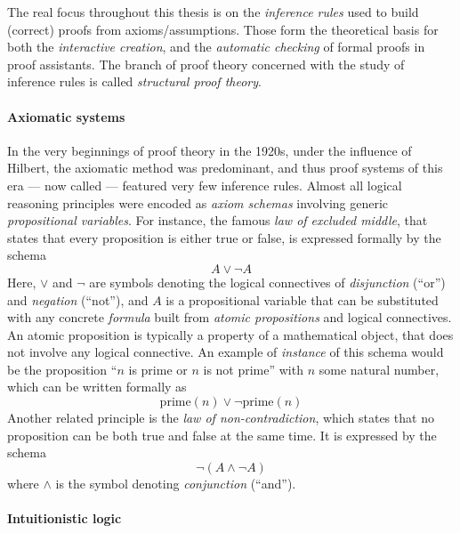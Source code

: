 \begin{emphpar}
The real focus throughout this thesis is on the \emph{inference rules} used to
build (correct) proofs from axioms/assumptions. Those form the theoretical basis
for both the \emph{interactive creation}, and the \emph{automatic checking} of
formal proofs in proof assistants. The branch of proof theory concerned with the
study of inference rules is called \emph{structural proof theory}.
\end{emphpar}

\paragraph{Axiomatic systems} 

In the very beginnings of proof theory in the 1920s, under the influence of
Hilbert, the axiomatic method was predominant, and thus proof systems of this
era --- now called  --- featured very few inference
rules. Almost all logical reasoning principles were encoded as \emph{axiom
schemas} involving generic \emph{propositional variables}. For instance, the
famous \emph{law of excluded middle}, that states that every proposition is
either true or false, is expressed formally by the schema
$$A \lor \neg A$$
Here, $\lor$ and $\neg$ are symbols denoting the logical connectives of
\emph{disjunction} (``or'') and \emph{negation} (``not''), and $A$ is a
propositional variable that can be substituted with any concrete \emph{formula}
built from \emph{atomic propositions} and logical connectives. An atomic
proposition is typically a property of a mathematical object, that does not
involve any logical connective. An example of \emph{instance} of this schema
would be the proposition ``$n$ is prime or $n$ is not prime'' with $n$ some
natural number, which can be written formally as
$$\mathrm{prime}(n) \lor \neg\mathrm{prime}(n)$$
Another related principle is the \emph{law of non-contradiction}, which states
that no proposition can be both true and false at the same time. It is expressed
by the schema
$$\neg (A \land \neg A)$$
where $\land$ is the symbol denoting \emph{conjunction} (``and'').

\paragraph{Intuitionistic logic}

